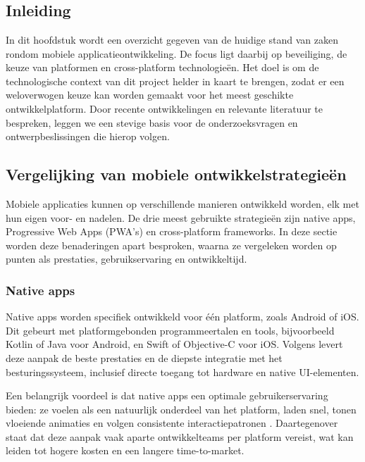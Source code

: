 \chapter{}
\label{ch:stand-van-zaken}

\section{Inleiding}
In dit hoofdstuk wordt een overzicht gegeven van de huidige stand van zaken rondom mobiele applicatieontwikkeling. De focus ligt daarbij op beveiliging, de keuze van platformen en cross-platform technologieën. Het doel is om de technologische context van dit project helder in kaart te brengen, zodat er een weloverwogen keuze kan worden gemaakt voor het meest geschikte ontwikkelplatform. Door recente ontwikkelingen en relevante literatuur te bespreken, leggen we een stevige basis voor de onderzoeksvragen en ontwerpbeslissingen die hierop volgen.

\section{Vergelijking van mobiele ontwikkelstrategieën}
Mobiele applicaties kunnen op verschillende manieren ontwikkeld worden, elk met hun eigen voor- en nadelen. De drie meest gebruikte strategieën zijn native apps, Progressive Web Apps (PWA’s) en cross-platform frameworks. In deze sectie worden deze benaderingen apart besproken, waarna ze vergeleken worden op punten als prestaties, gebruikservaring en ontwikkeltijd.

\subsection{Native apps}
Native apps worden specifiek ontwikkeld voor één platform, zoals Android of iOS. Dit gebeurt met platformgebonden programmeertalen en tools, bijvoorbeeld Kotlin of Java voor Android, en Swift of Objective-C voor iOS. Volgens \textcite{Gillis} levert deze aanpak de beste prestaties en de diepste integratie met het besturingssysteem, inclusief directe toegang tot hardware en native UI-elementen.

Een belangrijk voordeel is dat native apps een optimale gebruikerservaring bieden: ze voelen als een natuurlijk onderdeel van het platform, laden snel, tonen vloeiende animaties en volgen consistente interactiepatronen \textcite{Gillis}. Daartegenover staat dat deze aanpak vaak aparte ontwikkelteams per platform vereist, wat kan leiden tot hogere kosten en een langere time-to-market.

